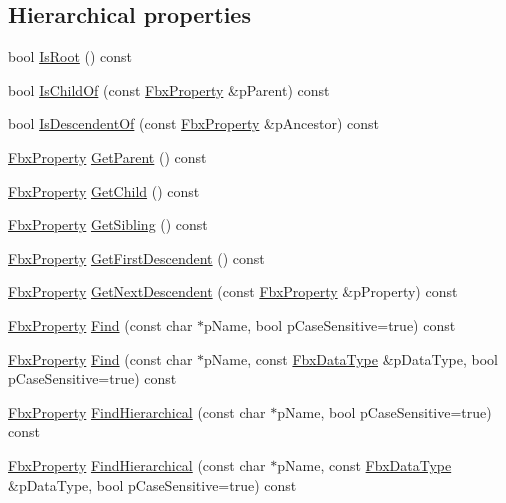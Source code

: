 \subsection*{Hierarchical properties}
\begin{DoxyCompactItemize}
\item 
bool \hyperlink{class_fbx_property_ac614dd09edb00ac99ce49332a66a597d}{Is\+Root} () const
\item 
bool \hyperlink{class_fbx_property_aa8284deb85f3a324db108291bc42284a}{Is\+Child\+Of} (const \hyperlink{class_fbx_property}{Fbx\+Property} \&p\+Parent) const
\item 
bool \hyperlink{class_fbx_property_aa346bfac7ee0847e7fa2a6dc4aba90ac}{Is\+Descendent\+Of} (const \hyperlink{class_fbx_property}{Fbx\+Property} \&p\+Ancestor) const
\item 
\hyperlink{class_fbx_property}{Fbx\+Property} \hyperlink{class_fbx_property_a2cafce5b279fd3dd3a01a618538c15ca}{Get\+Parent} () const
\item 
\hyperlink{class_fbx_property}{Fbx\+Property} \hyperlink{class_fbx_property_a0b677f1fd948cfc645962a91b1ed928f}{Get\+Child} () const
\item 
\hyperlink{class_fbx_property}{Fbx\+Property} \hyperlink{class_fbx_property_ac723c81393df4b2fdedd78863b361ab5}{Get\+Sibling} () const
\item 
\hyperlink{class_fbx_property}{Fbx\+Property} \hyperlink{class_fbx_property_ad7f8dea372a3401119e18f23b03691f4}{Get\+First\+Descendent} () const
\item 
\hyperlink{class_fbx_property}{Fbx\+Property} \hyperlink{class_fbx_property_a1de724032949fd7a7b21028894adbcce}{Get\+Next\+Descendent} (const \hyperlink{class_fbx_property}{Fbx\+Property} \&p\+Property) const
\item 
\hyperlink{class_fbx_property}{Fbx\+Property} \hyperlink{class_fbx_property_af6dc98aa7ae9fd339f5b463845f56b29}{Find} (const char $\ast$p\+Name, bool p\+Case\+Sensitive=true) const
\item 
\hyperlink{class_fbx_property}{Fbx\+Property} \hyperlink{class_fbx_property_acd7815414a490b7d6c2fb6bf1d95536e}{Find} (const char $\ast$p\+Name, const \hyperlink{class_fbx_data_type}{Fbx\+Data\+Type} \&p\+Data\+Type, bool p\+Case\+Sensitive=true) const
\item 
\hyperlink{class_fbx_property}{Fbx\+Property} \hyperlink{class_fbx_property_aa3c6cdd5991e086121dc7d724846e444}{Find\+Hierarchical} (const char $\ast$p\+Name, bool p\+Case\+Sensitive=true) const
\item 
\hyperlink{class_fbx_property}{Fbx\+Property} \hyperlink{class_fbx_property_a5daed7a38564da53f44bdaa5f71f7837}{Find\+Hierarchical} (const char $\ast$p\+Name, const \hyperlink{class_fbx_data_type}{Fbx\+Data\+Type} \&p\+Data\+Type, bool p\+Case\+Sensitive=true) const
\end{DoxyCompactItemize}
